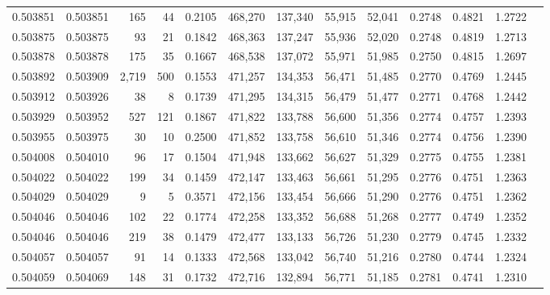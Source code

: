 \begin{tabular}{rrrrrrrrrrrrr}
0.503851 & 0.503851 &   165 &    44 &                                     0.2105 & 468,270 & 137,340 &  55,915 &  52,041 & 0.2748 & 0.4821 & 1.2722 \\
0.503875 & 0.503875 &    93 &    21 &                                     0.1842 & 468,363 & 137,247 &  55,936 &  52,020 & 0.2748 & 0.4819 & 1.2713 \\
0.503878 & 0.503878 &   175 &    35 &                                     0.1667 & 468,538 & 137,072 &  55,971 &  51,985 & 0.2750 & 0.4815 & 1.2697 \\
0.503892 & 0.503909 & 2,719 &   500 &                                     0.1553 & 471,257 & 134,353 &  56,471 &  51,485 & 0.2770 & 0.4769 & 1.2445 \\
0.503912 & 0.503926 &    38 &     8 &                                     0.1739 & 471,295 & 134,315 &  56,479 &  51,477 & 0.2771 & 0.4768 & 1.2442 \\
0.503929 & 0.503952 &   527 &   121 &                                     0.1867 & 471,822 & 133,788 &  56,600 &  51,356 & 0.2774 & 0.4757 & 1.2393 \\
0.503955 & 0.503975 &    30 &    10 &                                     0.2500 & 471,852 & 133,758 &  56,610 &  51,346 & 0.2774 & 0.4756 & 1.2390 \\
0.504008 & 0.504010 &    96 &    17 &                                     0.1504 & 471,948 & 133,662 &  56,627 &  51,329 & 0.2775 & 0.4755 & 1.2381 \\
0.504022 & 0.504022 &   199 &    34 &                                     0.1459 & 472,147 & 133,463 &  56,661 &  51,295 & 0.2776 & 0.4751 & 1.2363 \\
0.504029 & 0.504029 &     9 &     5 &                                     0.3571 & 472,156 & 133,454 &  56,666 &  51,290 & 0.2776 & 0.4751 & 1.2362 \\
0.504046 & 0.504046 &   102 &    22 &                                     0.1774 & 472,258 & 133,352 &  56,688 &  51,268 & 0.2777 & 0.4749 & 1.2352 \\
0.504046 & 0.504046 &   219 &    38 &                                     0.1479 & 472,477 & 133,133 &  56,726 &  51,230 & 0.2779 & 0.4745 & 1.2332 \\
0.504057 & 0.504057 &    91 &    14 &                                     0.1333 & 472,568 & 133,042 &  56,740 &  51,216 & 0.2780 & 0.4744 & 1.2324 \\
0.504059 & 0.504069 &   148 &    31 &                                     0.1732 & 472,716 & 132,894 &  56,771 &  51,185 & 0.2781 & 0.4741 & 1.2310 \\

\end{tabular}
